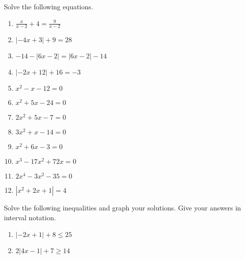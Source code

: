 \documentclass{article}
\begin{document}
\ReviewTitle[class={College Algebra}, for={Test 1}]

Solve the following equations.

\begin{enumerate}
\item $\displaystyle\frac{x}{x - 2} + 4 = \displaystyle\frac{9}{x - 2}$ \vspace{4cm}

\item $|-4x + 3| + 9 = 28$ \vspace{4cm}

\item $-14 - |6x - 2| = |6x - 2| - 14$ \vspace{4cm}

\item $|-2x + 12| + 16 = -3$ \vspace{4cm}

\newpage

\item $x^2 - x - 12 = 0$

   \vspace{4cm}

\item $x^2 + 5x - 24 = 0$

   \vspace{4cm}

\item $2x^2 + 5x - 7 = 0$

   \vspace{4cm}

\item $3x^2 + x - 14 = 0$

   \vspace{4cm}

\item 

$x^2 + 6x - 3 = 0$

   \vspace{4cm}

\newpage

\item $x^3 - 17x^2 + 72x = 0$

   \vspace{4cm}

\item $2x^4 - 3x^2 - 35 = 0$

   \vspace{4cm}

\item $|x^2 + 2x + 1| = 4$

   \vspace{4cm}
\end{enumerate}

Solve the following inequalities and graph your solutions. Give your answers in interval notation.

\begin{enumerate}
\item $|-2x + 1| + 8 \leq 25$ \vspace{4cm}

\item $2|4x - 1| + 7 \geq 14$
\end{enumerate}
\end{document}
